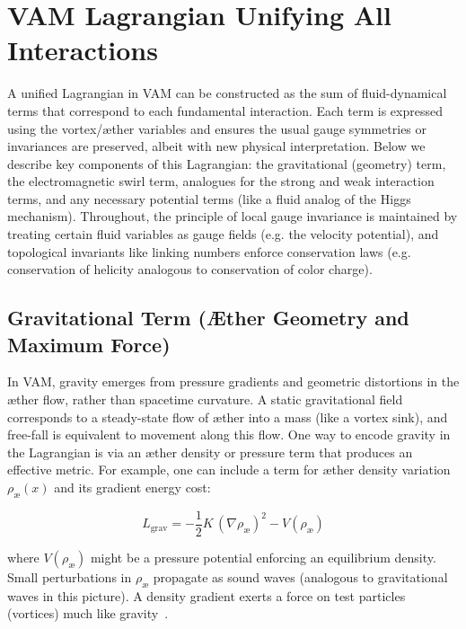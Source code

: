 \section{VAM Lagrangian Unifying All Interactions}

A unified Lagrangian in VAM can be constructed as the sum of fluid-dynamical terms that correspond to each fundamental interaction. Each term is expressed using the vortex/æther variables and ensures the usual gauge symmetries or invariances are preserved, albeit with new physical interpretation. Below we describe key components of this Lagrangian: the gravitational (geometry) term, the electromagnetic swirl term, analogues for the strong and weak interaction terms, and any necessary potential terms (like a fluid analog of the Higgs mechanism). Throughout, the principle of local gauge invariance is maintained by treating certain fluid variables as gauge fields (e.g. the velocity potential), and topological invariants like linking numbers enforce conservation laws (e.g. conservation of helicity analogous to conservation of color charge).

\subsection{Gravitational Term (Æther Geometry and Maximum Force)}

In VAM, gravity emerges from pressure gradients and geometric distortions in the æther flow, rather than spacetime curvature. A static gravitational field corresponds to a steady-state flow of æther into a mass (like a vortex sink), and free-fall is equivalent to movement along this flow. One way to encode gravity in the Lagrangian is via an æther density or pressure term that produces an effective metric. For example, one can include a term for æther density variation $\rho_{\text{\ae}}(x)$ and its gradient energy cost:

\begin{equation}
    L_{\text{grav}} = -\frac{1}{2}K\,(\nabla \rho_{\text{\ae}})^2 - V(\rho_{\text{\ae}})
    \label{eq:grav-lagrangian}
\end{equation}

where $V(\rho_{\text{\ae}})$ might be a pressure potential enforcing an equilibrium density. Small perturbations in $\rho_{\text{\ae}}$ propagate as sound waves (analogous to gravitational waves in this picture). A density gradient exerts a force on test particles (vortices) much like gravity~\cite{VAM3}.


